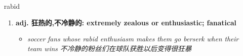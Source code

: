 
\begin{frame}
{\huge rabid}
\begin{center}
\begin{enumerate}\Large
  \item \textbf{adj. 狂热的,不冷静的: extremely zealous or enthusiastic; fanatical}
  \begin{itemize}
    \item \em{\Large{soccer fans whose rabid enthusiasm makes them go berserk when their team wins 不冷静的粉丝们在球队获胜以后变得很狂暴}}
  \end{itemize}
\end{enumerate}
\end{center}
\end{frame}
